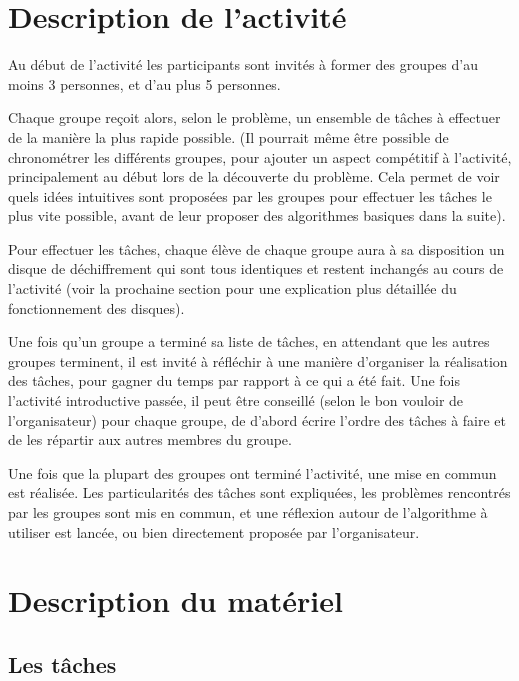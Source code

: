 \documentclass{article}
\begin{document}
    
\section{Description de l'activité}
Au début de l'activité les participants sont invités à former des groupes d'au moins 3 personnes, et d'au plus 5 personnes. 

Chaque groupe reçoit alors, selon le problème, un ensemble de tâches à effectuer de la manière la plus rapide possible. (Il pourrait même être possible de chronométrer les différents groupes, pour ajouter un aspect compétitif à l'activité, principalement au début lors de la découverte du problème. Cela permet de voir quels idées intuitives sont proposées par les groupes pour effectuer les tâches le plus vite possible, avant de leur proposer des algorithmes basiques dans la suite).

Pour effectuer les tâches, chaque élève de chaque groupe aura à sa disposition un disque de déchiffrement qui sont tous identiques et restent inchangés au cours de l'activité (voir la prochaine section pour une explication plus détaillée du fonctionnement des disques).

Une fois qu'un groupe a terminé sa liste de tâches, en attendant que les autres groupes terminent, il est invité à réfléchir à une manière d'organiser la réalisation des tâches, pour gagner du temps par rapport à ce qui a été fait. Une fois l'activité introductive passée, il peut être conseillé (selon le bon vouloir de l'organisateur) pour chaque groupe, de d'abord écrire l'ordre des tâches à faire et de les répartir aux autres membres du groupe.

Une fois que la plupart des groupes ont terminé l'activité, une mise en commun est réalisée. 
Les particularités des tâches sont expliquées, les problèmes rencontrés par les groupes sont mis en commun, et une réflexion autour de l'algorithme à utiliser est lancée, ou bien directement proposée par l'organisateur.  

\section{Description du matériel}

\subsection{Les tâches}


\end{document}
